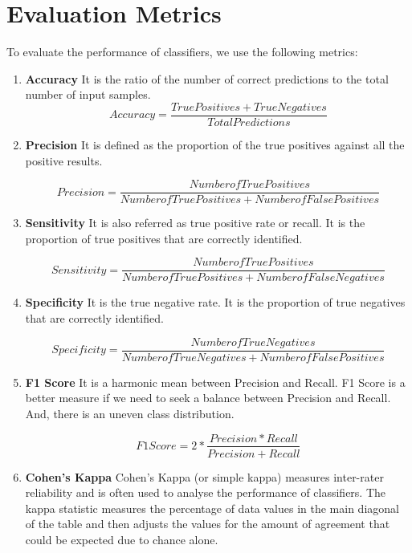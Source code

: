 \documentclass[]{article}
\begin{document}
\section{Evaluation Metrics}
\label{sec:metrics}

To evaluate the performance of classifiers, we use the following
metrics:

\begin{enumerate}
\item \textbf{Accuracy}
It is the ratio of the number of correct predictions to the total number of input samples.
\begin{equation}
Accuracy = \frac{True Positives + True Negatives} {Total Predictions}
\end{equation}

\item \textbf{Precision}
It is defined as the proportion of the true positives against all the positive
results.

\begin{equation}
Precision = \frac{Number of True Positives} {Number of True Positives + Number of False Positives}
\end{equation}

\item \textbf{Sensitivity}
It is also referred as true positive rate or recall. It is the proportion of true positives that are correctly identified.

\begin{equation}
Sensitivity = \frac{Number of True Positives} {Number of True Positives + Number of False Negatives}
\end{equation}


\item \textbf{Specificity}
It is the true negative rate. It is the proportion of true negatives that are
correctly identified.

\begin{equation}
Specificity = \frac{Number of True Negatives} {Number of True Negatives + Number of False Positives}
\end{equation}

\item \textbf{F1 Score}
It is a harmonic mean between Precision and Recall. F1 Score is a better measure if we need to seek a balance between Precision and Recall. And, there is an uneven class distribution. 


\begin{equation}
F1 Score = 2 * \frac{Precision * Recall} {Precision + Recall}
\end{equation}

\item \textbf{Cohen's Kappa}
Cohen's Kappa (or simple kappa) measures inter-rater reliability and is often used to analyse the performance of classifiers. The kappa statistic measures the percentage of data values in the main diagonal of the table and then adjusts the values for the amount of agreement that could be expected due to chance alone.

\end{enumerate}
\end{document}
